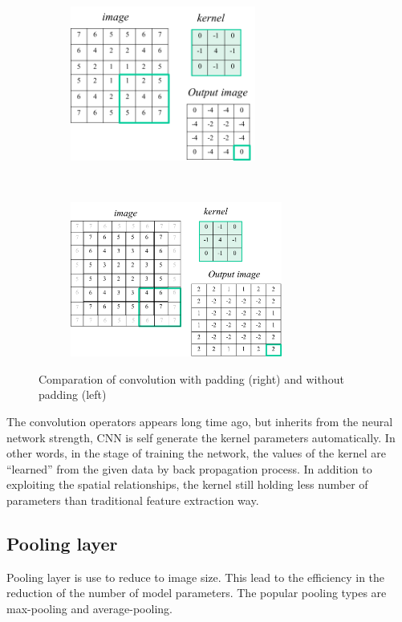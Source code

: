 \begin{figure}[t!]
    \centering
    \begin{subfigure}
        \centering
        \includegraphics[height=2in]{content/resources/new_images/background/2dconv_nopad.png}
    \end{subfigure}%
    ~ 
    \begin{subfigure}
        \centering
        \includegraphics[height=2in]{content/resources/new_images/background/2dconv_padding.png}
    \end{subfigure}
    \caption{Comparation of convolution with padding (right) and without padding (left)}
\end{figure}

The convolution operators appears long time ago, but inherits from the neural network strength, CNN is self generate the kernel parameters automatically. In other words, in the stage of training the network, the values of the kernel are “learned” from the given data by back propagation process. In addition to exploiting the spatial relationships, the kernel still holding less number of parameters than traditional feature extraction way.

\subsection{Pooling layer}
Pooling layer is use to reduce to image size. This lead to the efficiency in the reduction of the number of model parameters. The popular pooling types are max-pooling and average-pooling.
